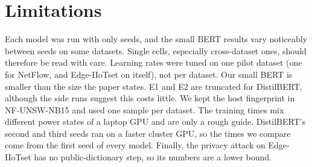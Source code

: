 \section*{Limitations}\label{sec:limitations}
Each model was run with only  seeds, and the small BERT results vary noticeably between seeds
on some datasets. Single cells, especially cross-dataset ones, should therefore be read with care. Learning rates were
tuned on one pilot dataset (one for NetFlow, and Edge-IIoTset on itself), not per dataset. Our small BERT is smaller
than the size the paper states. E1 and E2 are truncated for DistilBERT, although the side runs suggest this costs
little. We kept the host fingerprint in NF-UNSW-NB15 and used one sample per dataset. The training times mix
different power states of a laptop GPU and are only a rough guide. DistilBERT's second and third seeds ran on a
faster cluster GPU, so the times we compare come from the first seed of every model. Finally, the privacy attack on Edge-IIoTset has no
public-dictionary step, so its numbers are a lower bound.
